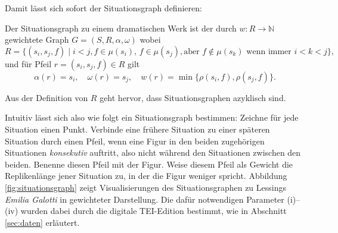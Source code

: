 \documentclass[a4paper,10pt,abstract=true,headings=small]{scrartcl}
\begin{document}
Damit lässt sich sofort der Situationsgraph definieren:
\begin{em}%
    Der Situationsgraph zu einem dramatischen Werk ist der durch $w\colon R\to \mathbb{N}$ gewichtete Graph $G=(S, R, \alpha, \omega)$ wobei
    \begin{equation*} R = \{ (s_i,s_j,f) \mid i<j, f\in \mu(s_i),\, f \in\mu(s_j), \text{aber $f\not\in\mu(s_k)$ wenn immer $i<k<j$} \},  \end{equation*}
    und für Pfeil $r=(s_i,s_j,f)\in R$ gilt
    \begin{equation*} \alpha(r) = s_i, \quad\omega(r) = s_j, \quad w(r) = \min\{ \rho(s_i, f), \rho(s_j, f) \} .\end{equation*}
\end{em}
Aus der Definition von $R$ geht hervor, dass Situationsgraphen azyklisch sind.

Intuitiv lässt sich also wie folgt ein Situationsgraph bestimmen: Zeichne für jede Situation einen Punkt.
Verbinde eine frühere Situation zu einer späteren Situation durch einen Pfeil,  wenn eine Figur in den beiden zugehörigen Situationen \emph{konsekutiv} auftritt, also nicht während den Situationen zwischen den beiden.
Benenne diesen Pfeil mit der Figur.
Weise diesem Pfeil als Gewicht die Replikenlänge jener Situation zu, in der die Figur weniger spricht.
Abbildung \ref{fig:situationsgraph} zeigt Visualisierungen des Situationsgraphen zu Lessings \emph{Emilia Galotti} in gewichteter Darstellung.
Die dafür notwendigen Parameter (i)–(iv) wurden dabei durch die digitale TEI-Edition bestimmt, wie in Abschnitt \ref{sec:daten} erläutert.
\end{document}
